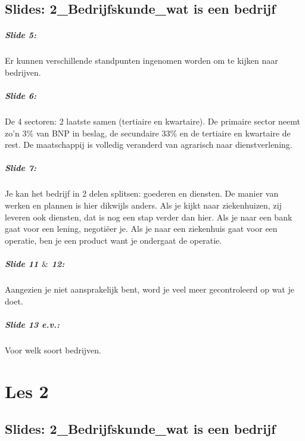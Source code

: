 \documentclass[10pt,a4paper]{report}
\begin{document}
\section{Slides: 2\_Bedrijfskunde\_wat is een bedrijf}

\paragraph{Slide 5:} Er kunnen verschillende standpunten ingenomen worden om te kijken naar bedrijven. 

\paragraph{Slide 6:} De 4 sectoren: 2 laatste samen (tertiaire en kwartaire). De primaire sector neemt zo'n 3\% van BNP in beslag, de secundaire 33\% en de tertiaire en kwartaire de rest. De maatschappij is volledig veranderd van agrarisch naar dienstverlening.

\paragraph{Slide 7:} Je kan het bedrijf in 2 delen splitsen: goederen en diensten. De manier van werken en plannen is hier dikwijls anders. Als je kijkt naar ziekenhuizen, zij leveren ook diensten, dat is nog een stap verder dan hier. Als je naar een bank gaat voor een lening, negoti\"eer je. Als je naar een ziekenhuis gaat voor een operatie, ben je een product want je ondergaat de operatie. 

\paragraph{Slide 11 $\&$ 12:} Aangezien je niet aansprakelijk bent, word je veel meer gecontroleerd op wat je doet. 

\paragraph{Slide 13 e.v.:} Voor welk soort bedrijven.

\chapter{Les 2}

\section{Slides: 2\_Bedrijfskunde\_wat is een bedrijf}
\end{document}
